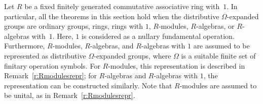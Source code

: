 \documentclass{jgcc}
\begin{document}
\begin{rem}
\label{r:ringmodalg}
Let $R$ be a fixed finitely generated commutative
associative ring with~$1$. In particular, all the theorems
in this section hold when the distributive $\Omega$-expanded
groups are ordinary groups, rings, rings with $1$,
$R$-modules, $R$-algebras, or $R$-algebras with~$1$. Here,
$1$ is considered as a nullary fundamental operation.
Furthermore, $R$-modules, $R$-algebras, and $R$-algebras
with $1$ are assumed to be represented as distributive
$\Omega$-expanded groups, where $\Omega$ is a suitable
finite set of finitary operation symbols. For $R$-modules,
this representation is described in
Remark~\ref{r:Rmodulesrepr}; for $R$-algebras and
$R$-algebras with $1$, the representation can be constructed
similarly. Note that $R$-modules are assumed to be unital,
as in Remark~\ref{r:Rmodulesrepr}.
\end{rem}



\end{document}
